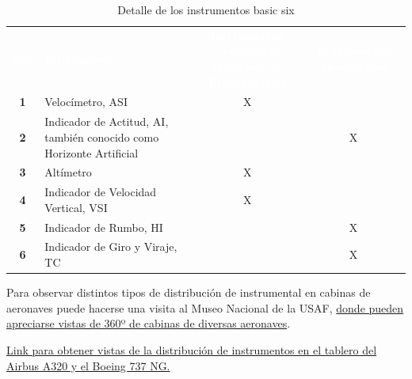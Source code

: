 \begin{table}[!htb]
  \centering
  \caption{Detalle de los instrumentos basic six}
  \label{tab:01.6-pack}
{\footnotesize
  \begin{tabular}{cm{}cc} \hline \rowcolor{azure} 
   \textcolor{white}{\bf Nro} & \centering \textcolor{white}{\bf Instrumento} 
	& \parbox{0.25\textwidth}{\textcolor{white}{\bf Instrumentos conectados \\al sistema de Pitot-Est\'atica}}
	& \parbox{0.15\textwidth}{\textcolor{white}{\bf Instrumentos girosc\'opicos}} \\ 
    {\bf 1} & Veloc\'imetro, \ac{ASI} & X & \\ 
    {\bf 2 } & Indicador de Actitud, \ac{AI}, tambi\'en conocido como Horizonte Artificial & & X \\
{\bf 3} & Alt\'imetro & X & \\ 
{\bf 4} & Indicador de Velocidad Vertical, \ac{VSI} & X & \\
{\bf 5} & Indicador de Rumbo, \ac{HI} & & X \\  
{\bf 6} & Indicador de Giro y Viraje, \ac{TC} & & X \\ \hline
  \end{tabular}
}
\end{table}







\begin{tcolorbox}
  
Para observar distintos tipos de distribuci\'on de instrumental en cabinas de aeronaves puede hacerse una visita al 
Museo Nacional de la USAF, 
\href{https://www.nationalmuseum.af.mil/Visit/Virtual-Tour/Cockpit360/}{donde pueden apreciarse vistas de 360º de cabinas de diversas aeronaves}.

\href{https://pmflight.co.uk/free-airbus-cockpit-posters/}{Link para obtener vistas de la distribuci\'on de instrumentos en el tablero del Airbus A320 y el Boeing 737 NG.}


\end{tcolorbox}


